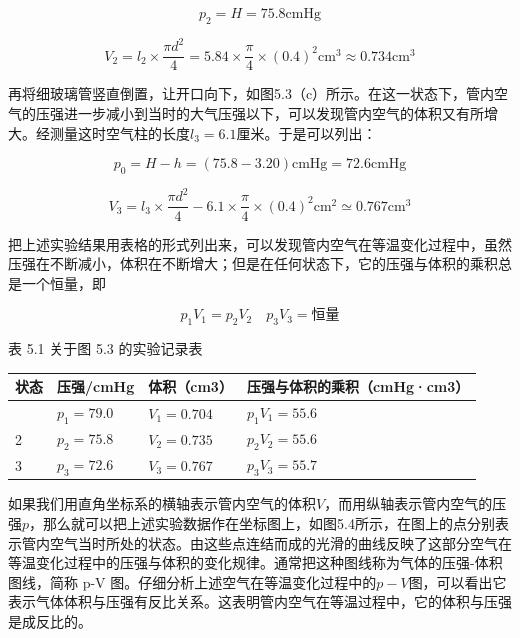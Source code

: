 \[
p _ {2} = H = 75.8 \mathrm{cmHg}
\]

\[
V _ {2} = l _ {2} \times \frac {\pi d ^ {2}}{4} = 5.84 \times \frac {\pi}{4} \times (0.4) ^ {2} \mathrm{cm} ^ {3} \approx 0.734 \mathrm{cm} ^ {3}
\]

再将细玻璃管竖直倒置，让开口向下，如图5.3（c）所示。在这一状态下，管内空气的压强进一步减小到当时的大气压强以下，可以发现管内空气的体积又有所增大。经测量这时空气柱的长度\(l_{3}=6.1\)厘米。于是可以列出：

\[
p _ {0} = H - h = (75.8 - 3.20) \mathrm{cmHg} = 72.6 \mathrm{cmHg}
\]

\[
V _ {3} = l _ {3} \times \frac {\pi d ^ {2}}{4} - 6.1 \times \frac {\pi}{4} \times (0.4) ^ {2} \mathrm{cm} ^ {2} \simeq 0.767 \mathrm{cm} ^ {3}
\]

把上述实验结果用表格的形式列出来，可以发现管内空气在等温变化过程中，虽然压强在不断减小，体积在不断增大；但是在任何状态下，它的压强与体积的乘积总是一个恒量，即

\[
p _ {1} V _ {1} = p _ {2} V _ {2} \quad p _ {3} V _ {3} = \text{恒量}
\]

表 5.1 关于图 5.3 的实验记录表

{\def\LTcaptype{none} %
\begin{longtable}[]{@{}llll@{}}
\toprule\noalign{}
状态 & 压强/cmHg & 体积（cm3） & 压强与体积的乘积（cmHg·cm3） \\
\midrule\noalign{}
\endhead
\bottomrule\noalign{}
\endlastfoot
1 & \(p_1 = 79.0\) & \(V_1 = 0.704\) & \(p_1V_1 = 55.6\) \\
2 & \(p_2 = 75.8\) & \(V_2 = 0.735\) & \(p_2V_2 = 55.6\) \\
3 & \(p_3 = 72.6\) & \(V_3 = 0.767\) & \(p_3V_3 = 55.7\) \\
\end{longtable}
}

如果我们用直角坐标系的横轴表示管内空气的体积\(V\)，而用纵轴表示管内空气的压强\(p\)，那么就可以把上述实验数据作在坐标图上，如图5.4所示，在图上的点分别表示管内空气当时所处的状态。由这些点连结而成的光滑的曲线反映了这部分空气在等温变化过程中的压强与体积的变化规律。通常把这种图线称为气体的压强-体积图线，简称
p-V
图。仔细分析上述空气在等温变化过程中的\(p - V\)图，可以看出它表示气体体积与压强有反比关系。这表明管内空气在等温过程中，它的体积与压强是成反比的。

